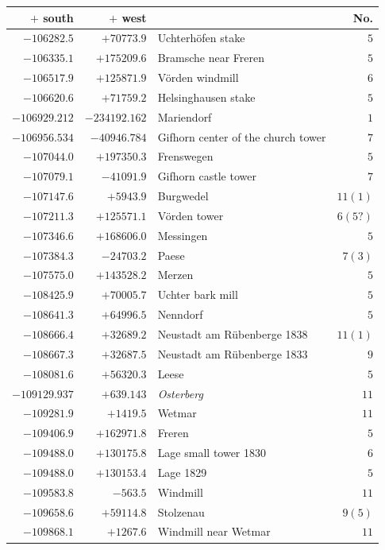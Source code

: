 \begin{center}\begingroup\fontsize{8}{9}\selectfont
\setlength{\tabcolsep}{4pt}
\begin{tabular}{r|r|p{170pt}|r}\hline
\(+\) south&\(+\) west&&No.\\\hline
\(-106282.5\)&\(+70773.9\)&Uchterhöfen stake&\(5\)\\
\(-106335.1\)&\(+175209.6\)&Bramsche near Freren&\(5\)\\
\(-106517.9\)&\(+125871.9\)&Vörden windmill&\(6\)\\
\(-106620.6\)&\(+71759.2\)&Helsinghausen stake&\(5\)\\
\(-106929.212\)&\(-234192.162\)&Mariendorf&\(1\)\\
\(-106956.534\)&\(-40946.784\)&Gifhorn center of the church tower&\(7\)\\
\(-107044.0\)&\(+197350.3\)&Frenswegen&\(5\)\\
\(-107079.1\)&\(-41091.9\)&Gifhorn castle tower&\(7\)\\
\(-107147.6\)&\(+5943.9\)&Burgwedel&\(11 (1)\)\\
\(-107211.3\)&\(+125571.1\)&Vörden tower&\(6(5?)\)\\
\(-107346.6\)&\(+168606.0\)&Messingen&\(5\)\\
\(-107384.3\)&\(-24703.2\)&Paese&\(7 (3)\)\\
\(-107575.0\)&\(+143528.2\)&Merzen&\(5\)\\
\(-108425.9\)&\(+70005.7\)&Uchter bark mill&\(5\)\\
\(-108641.3\)&\(+64996.5\)&Nenndorf&\(5\)\\
\(-108666.4\)&\(+32689.2\)&Neustadt am Rübenberge 1838&\(11 (1)\)\\
\(-108667.3\)&\(+32687.5\)&Neustadt am Rübenberge 1833&\(9\)\\
\(-108081.6\)&\(+56320.3\)&Leese&\(5\)\\
\(-109129.937\)&\(+639.143\)&\textit{Osterberg}&\(11\)\\
\(-109281.9\)&\(+1419.5\)&Wetmar&\(11\)\\
\(-109406.9\)&\(+162971.8\)&Freren&\(5\)\\
\(-109488.0\)&\(+130175.8\)&Lage small tower 1830&\(6\)\\
\(-109488.0\)&\(+130153.4\)&Lage 1829&\(5\)\\
\(-109583.8\)&\(-563.5\)&Windmill&\(11\)\\
\(-109658.6\)&\(+59114.8\)&Stolzenau&\(9 (5)\)\\
\(-109868.1\)&\(+1267.6\)&Windmill near Wetmar&\(11\)\\

\end{tabular}
\end{center}
